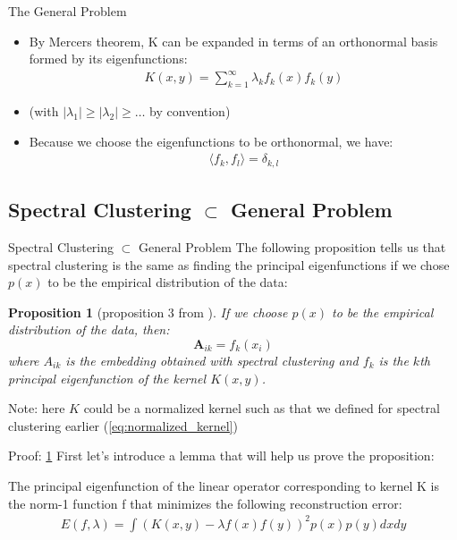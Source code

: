 \documentclass[aspectratio=169]{beamer}
\newtheorem{prop}{Proposition}
\begin{document}
\begin{frame}{The General Problem}
  \begin{itemize}
    \item By Mercers theorem, K can be expanded in terms of an orthonormal basis formed by its eigenfunctions:
      \begin{align}
        K(x,y) = \sum_{k=1}^{\infty} \lambda_{k} f_{k}(x) f_{k}(y)
      \end{align}
    \item (with $|\lambda_{1}| \geq |\lambda_{2}| \geq \ldots$ by convention)
    \item Because we choose the eigenfunctions to be orthonormal, we have:
      \begin{align*}
        \langle f_{k},f_{l} \rangle = \delta_{k,l}
      \end{align*}
  \end{itemize}
\end{frame}

\subsection{Spectral Clustering \texorpdfstring{$\subset$}{TEXT} General Problem}
\begin{frame}{Spectral Clustering \texorpdfstring{$\subset$}{TEXT} General Problem}
  The following proposition tells us that spectral clustering is the same as finding the principal eigenfunctions if we chose $p(x)$ to be the empirical distribution of the data:
  \begin{prop}[proposition 3 from \cite{bengio2003learning}] \label{prop:sc}
  If we choose $p(x)$ to be the empirical distribution of the data, then:
  \begin{equation}
    \mathbf{A}_{ik} = f_{k} (x_{i}) 
  \end{equation}
  where $A_{ik}$ is the embedding obtained with spectral clustering and $f_{k}$ is the $k$th principal eigenfunction of the kernel $K(x,y)$.
  \end{prop}
  Note: here $K$ could be a normalized kernel such as that we defined for spectral clustering earlier (\cref{eq:normalized_kernel})
\end{frame}

\begin{frame}{Proof: \cref{prop:sc}}
  First let's introduce a lemma that will help us prove the proposition:
  \begin{lemma} \label{lemma:prop1}
    The principal eigenfunction of the linear operator corresponding to kernel K is the norm-1 function f that minimizes the following reconstruction error:
    \begin{align*}
      E(f, \lambda) = \int (K(x,y) - \lambda f(x) f(y))^{2} p(x) p(y) dx dy
    \end{align*}
  \end{lemma}
\end{frame}
\end{document}
